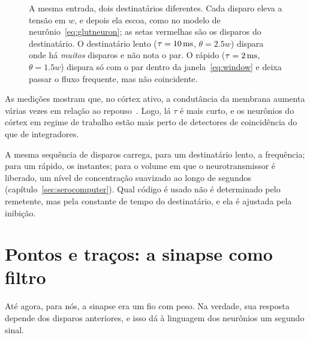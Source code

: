 \begin{figure}[t]
\caption{A mesma entrada, dois destinatários diferentes. Cada disparo eleva a tensão em $w$, e depois ela escoa, como no modelo de neurônio~\eqref{eq:glutneuron}; as setas vermelhas são os disparos do destinatário. O destinatário lento ($\tau=10\,\text{ms}$, $\theta=2.5w$) dispara onde há \emph{muitos} disparos e não nota o par. O rápido ($\tau=2\,\text{ms}$, $\theta=1.5w$) dispara só com o par dentro da janela~\eqref{eq:window} e deixa passar o fluxo frequente, mas não coincidente.}
\label{fig:reader}
\end{figure}

As medições mostram que, no córtex ativo, a condutância da membrana aumenta várias vezes em relação ao repouso~\cite{Destexhe2003}. Logo, lá $\tau$ é mais curto, e os neurônios do córtex em regime de trabalho estão mais perto de detectores de coincidência do que de integradores.

\begin{keyblock}
\begin{proposition}
\label{prop:reader}
A mesma sequência de disparos carrega, para um destinatário lento, a frequência; para um rápido, os instantes; para o volume em que o neurotransmissor é liberado, um nível de concentração suavizado ao longo de segundos (capítulo~\ref{sec:serocomputer}). Qual código é usado não é determinado pelo remetente, mas pela constante de tempo do destinatário, e ela é ajustada pela inibição.
\end{proposition}
\end{keyblock}
\section{Pontos e traços: a sinapse como filtro}

Até agora, para nós, a sinapse era um fio com peso. Na verdade, sua resposta depende dos disparos anteriores, e isso dá à linguagem dos neurônios um segundo sinal.

